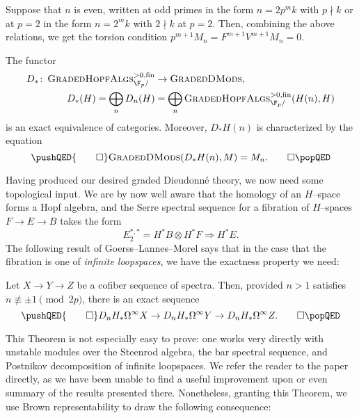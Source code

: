 \begin{remark}
Suppose that \(n\) is even, written at odd primes in the form \(n = 2p^m k\) with \(p \nmid k\) or at \(p = 2\) in the form \(n = 2^m k\) with \(2 \nmid k\) at \(p = 2\).  Then, combining the above relations, we get the torsion condition \(p^{m+1} M_n = F^{m+1} V^{m+1} M_n = 0\).
\end{remark}

\begin{theorem}
The functor
\begin{align*}
D_*\co \CatOf{GradedHopfAlgs}^{>0, \fin}_{\F_p/} & \to \CatOf{GradedDMods}, \\
D_*(H) = \bigoplus_n D_n(H) & = \bigoplus_n \CatOf{GradedHopfAlgs}^{>0, \fin}_{\F_p/}(H(n), H)
\end{align*}
is an exact equivalence of categories.  Moreover, \(D_* H(n)\) is characterized by the equation
\[\pushQED{\qed}
\CatOf{GradedDMods}(D_* H(n), M) = M_n. \qedhere
\popQED\]
\end{theorem}

Having produced our desired graded Dieudonn\'e theory, we now need some topological input.  We are by now well aware that the homology of an \(H\)--space forms a Hopf algebra, and the Serre spectral sequence for a fibration of \(H\)--spaces \(F \to E \to B\) takes the form \[E_2^{*, *} = H^* B \otimes H^* F \Rightarrow H^* E.\]  The following result of Goerss--Lannes--Morel says that in the case that the fibration is one of \emph{infinite loopspaces}, we have the exactness property we need:

\begin{theorem}
Let \(X \to Y \to Z\) be a cofiber sequence of spectra.  Then, provided \(n > 1\) satisfies \(n \not\equiv \pm 1 \pmod{2p}\), there is an exact sequence
\[\pushQED{\qed}
D_n H_* \Loops^\infty X \to D_n H_* \Loops^\infty Y \to D_n H_* \Loops^\infty Z. \qedhere
\popQED\]
\end{theorem}

\noindent This Theorem is not especially easy to prove: one works very directly with unstable modules over the Steenrod algebra, the bar spectral sequence, and Postnikov decomposition of infinite loopspaces.  We refer the reader to the paper directly, as we have been unable to find a useful improvement upon or even summary of the results presented there.  Nonetheless, granting this Theorem, we use Brown representability to draw the following consequence:

